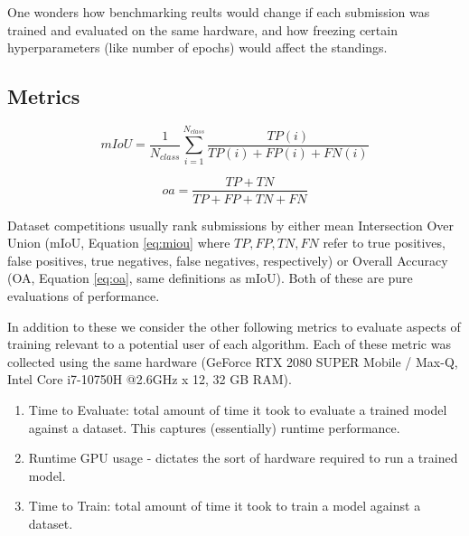 One wonders how benchmarking reults would change if each submission was trained and evaluated on the same hardware, and how freezing certain hyperparameters (like number of epochs) would affect the standings.

\subsection{Metrics}
\label{metrics}

\begin{equation}
  \label{eq:miou}
  mIoU = \frac{1}{N_{class}}\sum_{i=1}^{N_{class}} \frac{TP(i)}{TP(i) + FP(i) + FN(i)}
\end{equation}

\begin{equation}
  \label{eq:oa}
  oa = \frac{TP + TN}{TP + FP + TN + FN}
\end{equation}

Dataset competitions usually rank submissions by either mean Intersection Over Union (mIoU, Equation \ref{eq:miou} where $TP,FP,TN,FN$ refer to true positives, false positives, true negatives, false negatives, respectively) or Overall Accuracy (OA, Equation \ref{eq:oa}, same definitions as mIoU). Both of these are pure evaluations of performance.

In addition to these we consider the other following metrics to evaluate aspects of training relevant to a potential user of each algorithm. Each of these metric was collected using the same hardware (GeForce RTX 2080 SUPER Mobile / Max-Q, Intel Core i7-10750H @2.6GHz x 12, 32 GB RAM).

\begin{enumerate}
  \item Time to Evaluate: total amount of time it took to evaluate a trained model against a dataset. This captures (essentially) runtime performance.
  \item Runtime GPU usage - dictates the sort of hardware required to run a trained model.
  \item Time to Train: total amount of time it took to train a model against a dataset.
\end{enumerate}

